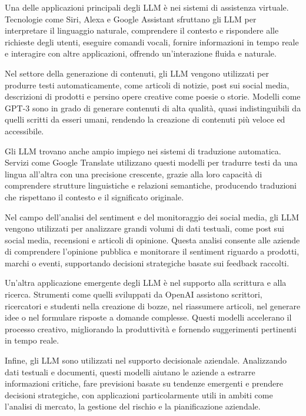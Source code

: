 \documentclass[a4paper,twoside,12pt]{toptesi}
\begin{document}
Una delle applicazioni principali degli LLM è nei sistemi di assistenza virtuale. Tecnologie come Siri, Alexa e Google Assistant sfruttano gli LLM per interpretare il linguaggio naturale, comprendere il contesto e rispondere alle richieste degli utenti, eseguire comandi vocali, fornire informazioni in tempo reale e interagire con altre applicazioni, offrendo un'interazione fluida e naturale.

Nel settore della generazione di contenuti, gli LLM vengono utilizzati per produrre testi automaticamente, come articoli di notizie, post sui social media, descrizioni di prodotti e persino opere creative come poesie o storie. Modelli come GPT-3 sono in grado di generare contenuti di alta qualità, quasi indistinguibili da quelli scritti da esseri umani, rendendo la creazione di contenuti più veloce ed accessibile.

Gli LLM trovano anche ampio impiego nei sistemi di traduzione automatica. Servizi come Google Translate utilizzano questi modelli per tradurre testi da una lingua all'altra con una precisione crescente, grazie alla loro capacità di comprendere strutture linguistiche e relazioni semantiche, producendo traduzioni che rispettano il contesto e il significato originale.

Nel campo dell'analisi del sentiment e del monitoraggio dei social media, gli LLM vengono utilizzati per analizzare grandi volumi di dati testuali, come post sui social media, recensioni e articoli di opinione. Questa analisi consente alle aziende di comprendere l'opinione pubblica e monitorare il sentiment riguardo a prodotti, marchi o eventi, supportando decisioni strategiche basate sui feedback raccolti.

Un'altra applicazione emergente degli LLM è nel supporto alla scrittura e alla ricerca. Strumenti come quelli sviluppati da OpenAI assistono scrittori, ricercatori e studenti nella creazione di bozze, nel riassumere articoli, nel generare idee o nel formulare risposte a domande complesse. Questi modelli accelerano il processo creativo, migliorando la produttività e fornendo suggerimenti pertinenti in tempo reale.

Infine, gli LLM sono utilizzati nel supporto decisionale aziendale. Analizzando dati testuali e documenti, questi modelli aiutano le aziende a estrarre informazioni critiche, fare previsioni basate su tendenze emergenti e prendere decisioni strategiche, con applicazioni particolarmente utili in ambiti come l'analisi di mercato, la gestione del rischio e la pianificazione aziendale.
\end{document}
